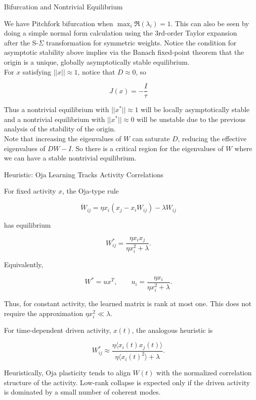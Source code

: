 \documentclass[
11pt,notheorems,hyperref={pdfauthor=whatever}
]{beamer}
\begin{document}
\begin{frame}{Bifurcation and Nontrivial Equilibrium}

We have Pitchfork bifurcation when $\max_i \mathfrak{R}(\lambda_i) = 1$. This can also be seen by doing a simple normal form calculation using the 3rd-order Taylor expansion after the S-$\Sigma$ transformation for symmetric weights. Notice the condition for asymptotic stability above implies via the Banach fixed-point theorem that the origin is a unique, globally asymptotically stable equilibrium.
\[\]
For $x$ satisfying $||x|| \approx 1$, notice that $D\approx0$, so

\[
J(x) = -\frac{I}{\tau}
\]

Thus a nontrivial equilibrium with $||x^*|| \approx 1$ will be locally asymptotically stable and a nontrivial equilibrium with $||x^*|| \approx 0$ will be unstable due to the previous analysis of the stability of the origin.
\[\]
Note that increasing the eigenvalues of $W$ can saturate $D$, reducing the effective eigenvalues of $DW - I$. So there is a critical region for the eigenvalues of $W$ where we can have a stable nontrivial equilibrium.

\end{frame}

\begin{frame}{Heuristic: Oja Learning Tracks Activity Correlations}
\small

For fixed activity \(x\), the Oja-type rule

\[
\dot W_{ij}
=
\eta x_i(x_j-x_iW_{ij})-\lambda W_{ij}
\]

has equilibrium

\[
W_{ij}^{\ast}
=
\frac{\eta x_i x_j}{\eta x_i^2+\lambda}.
\]

Equivalently,

\[
W^\ast = u x^T,
\qquad
u_i=
\frac{\eta x_i}{\eta x_i^2+\lambda}.
\]

Thus, for constant activity, the learned matrix is rank at most one. This
does not require the approximation
\(\eta x_i^2 \ll \lambda\).

\vspace{0.5em}

For time-dependent driven activity, \(x(t)\), the analogous heuristic is

\[
W_{ij}^{\ast}
\approx
\frac{\eta \langle x_i(t)x_j(t)\rangle}
{\eta \langle x_i(t)^2\rangle+\lambda}.
\]

Heuristically, Oja plasticity tends to align \(W(t)\) with the normalized correlation
structure of the activity. Low-rank collapse is expected only if the driven
activity is dominated by a small number of coherent modes.

\end{frame}
\end{document}
